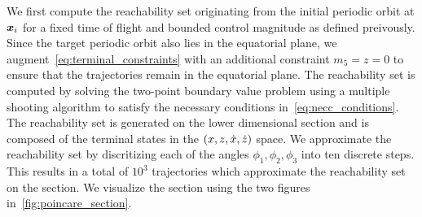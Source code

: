 \documentclass[]{aiaa-tc}%
\begin{document}
We first compute the reachability set originating from the initial periodic orbit at \( \bm{x}_i\) for a fixed time of flight and bounded control magnitude as defined preivously.
Since the target periodic orbit also lies in the equatorial plane, we augment~\cref{eq:terminal_constraints} with an additional constraint \( m_5 = z = 0\) to ensure that the trajectories remain in the equatorial plane.
The reachability set is computed by solving the two-point boundary value problem using a multiple shooting algorithm to satisfy the necessary conditions in~\cref{eq:necc_conditions}.
The reachability set is generated on the lower dimensional \Poincare section and is composed of the terminal states in the \( \left( x,z,\dot{x},\dot{z}  \right) \) space.
We approximate the reachability set by discritizing each of the angles \( \phi_1, \phi_2 , \phi_3 \) into ten discrete steps. 
This results in a total of \(10^3\) trajectories which approximate the reachability set on the \Poincare section.
We visualize the section using the two figures in~\cref{fig:poincare_section}.
\end{document}
